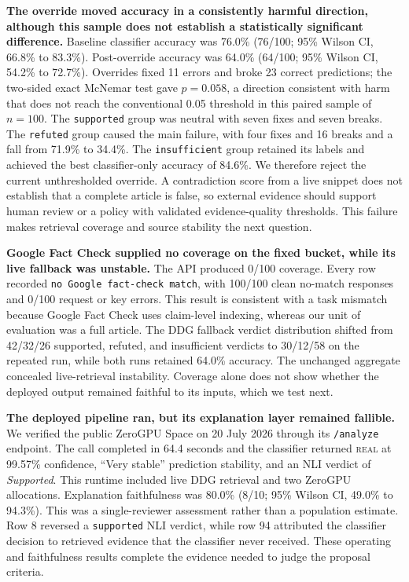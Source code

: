 \documentclass[10pt,twocolumn,letterpaper]{article}
\begin{document}
\textbf{The override moved accuracy in a consistently harmful direction, although
this sample does not establish a statistically significant difference.} Baseline
classifier accuracy was 76.0\% (76/100; 95\% Wilson CI, 66.8\% to 83.3\%).
Post-override accuracy was 64.0\% (64/100; 95\% Wilson CI, 54.2\% to 72.7\%).
Overrides fixed 11 errors and broke 23 correct predictions; the two-sided exact
McNemar test gave $p=0.058$, a direction consistent with harm that does not reach
the conventional 0.05 threshold in this paired sample of $n=100$. The
\texttt{supported} group was neutral with seven fixes and seven breaks. The
\texttt{refuted} group caused the main failure, with four fixes and 16 breaks and a
fall from 71.9\% to 34.4\%. The \texttt{insufficient} group retained its labels and
achieved the best classifier-only accuracy of 84.6\%. We therefore reject the
current unthresholded override. A contradiction score from a live snippet does not
establish that a complete article is false, so external evidence should support
human review or a policy with validated evidence-quality thresholds. This failure
makes retrieval coverage and source stability the next question.

\textbf{Google Fact Check supplied no coverage on the fixed bucket, while its live
fallback was unstable.} The API produced 0/100 coverage. Every row recorded
\texttt{no Google fact-check match}, with 100/100 clean no-match responses and
0/100 request or key errors. This result is consistent with a task mismatch because
Google Fact Check uses claim-level indexing, whereas our unit of evaluation was a
full article. The DDG fallback verdict distribution shifted from 42/32/26
supported, refuted, and insufficient verdicts to 30/12/58 on the repeated run,
while both runs retained 64.0\% accuracy. The unchanged aggregate concealed
live-retrieval instability. Coverage alone does not show whether the deployed
output remained faithful to its inputs, which we test next.

\textbf{The deployed pipeline ran, but its explanation layer remained fallible.}
We verified the public ZeroGPU Space on 20 July 2026 through its
\texttt{/analyze} endpoint. The call completed in 64.4 seconds and the classifier
returned \textsc{real} at 99.57\% confidence, ``Very stable'' prediction
stability, and an NLI verdict of \emph{Supported}. This runtime included live DDG
retrieval and two ZeroGPU allocations. Explanation faithfulness was 80.0\% (8/10;
95\% Wilson CI, 49.0\% to 94.3\%). This was a single-reviewer assessment rather
than a population estimate. Row 8 reversed a \texttt{supported} NLI verdict, while
row 94 attributed the classifier decision to retrieved evidence that the classifier
never received. These operating and faithfulness results complete the evidence
needed to judge the proposal criteria.
\end{document}
